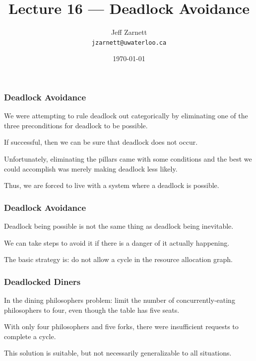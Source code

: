 

\title{Lecture 16 --- Deadlock Avoidance }

\author{Jeff Zarnett \\ \small \texttt{jzarnett@uwaterloo.ca}}
\date{\today}




\begin{frame}
  \titlepage

 \end{frame}

\begin{frame}
\frametitle{Deadlock Avoidance}

We were attempting to rule deadlock out categorically by eliminating one of the three preconditions for deadlock to be possible. 

If successful, then we can be sure that deadlock does not occur. 

Unfortunately, eliminating the pillars came with some conditions and the best we could accomplish was merely making deadlock less likely. 

Thus, we are forced to live with a system where a deadlock is possible. 
\end{frame}


\begin{frame}
\frametitle{Deadlock Avoidance}

Deadlock being possible is not the same thing as deadlock being inevitable.

We can take steps to avoid it if there is a danger of it actually happening. 

The basic strategy is: do not allow a cycle in the resource allocation graph.


\end{frame}

\begin{frame}
\frametitle{Deadlocked Diners}

In the dining philosophers problem: limit the number of concurrently-eating philosophers to four, even though the table has five seats. 

With only four philosophers and five forks, there were insufficient requests to complete a cycle. 

This solution is suitable, but not necessarily generalizable to all situations.

\end{frame}

